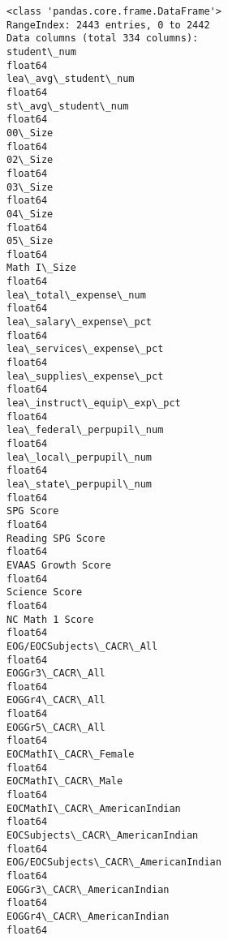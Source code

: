 \documentclass[11pt]{article}
\begin{document}
    \begin{Verbatim}[commandchars=\\\{\}]
<class 'pandas.core.frame.DataFrame'>
RangeIndex: 2443 entries, 0 to 2442
Data columns (total 334 columns):
student\_num                                                     float64
lea\_avg\_student\_num                                             float64
st\_avg\_student\_num                                              float64
00\_Size                                                         float64
02\_Size                                                         float64
03\_Size                                                         float64
04\_Size                                                         float64
05\_Size                                                         float64
Math I\_Size                                                     float64
lea\_total\_expense\_num                                           float64
lea\_salary\_expense\_pct                                          float64
lea\_services\_expense\_pct                                        float64
lea\_supplies\_expense\_pct                                        float64
lea\_instruct\_equip\_exp\_pct                                      float64
lea\_federal\_perpupil\_num                                        float64
lea\_local\_perpupil\_num                                          float64
lea\_state\_perpupil\_num                                          float64
SPG Score                                                       float64
Reading SPG Score                                               float64
EVAAS Growth Score                                              float64
Science Score                                                   float64
NC Math 1 Score                                                 float64
EOG/EOCSubjects\_CACR\_All                                        float64
EOGGr3\_CACR\_All                                                 float64
EOGGr4\_CACR\_All                                                 float64
EOGGr5\_CACR\_All                                                 float64
EOCMathI\_CACR\_Female                                            float64
EOCMathI\_CACR\_Male                                              float64
EOCMathI\_CACR\_AmericanIndian                                    float64
EOCSubjects\_CACR\_AmericanIndian                                 float64
EOG/EOCSubjects\_CACR\_AmericanIndian                             float64
EOGGr3\_CACR\_AmericanIndian                                      float64
EOGGr4\_CACR\_AmericanIndian                                      float64

\end{Verbatim}
\end{document}
